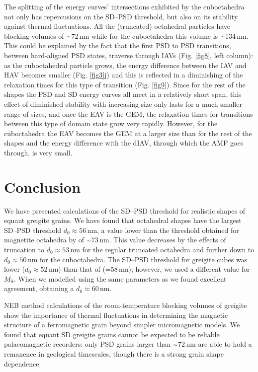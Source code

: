 \documentclass[review,authoryear]{elsarticle}
\newcommand{\roughly}{{\raise.17ex\hbox{$\scriptstyle\sim$}}}
\newcommand{\nm}{\,\text{nm}}
\begin{document}
The splitting of the energy curves' intersections exhibited by the cuboctahedra not only has repercusions on the SD--PSD threshold, but also on its stability against thermal fluctuations. All the (truncated) octahedral particles have blocking volumes of $\roughly$72$\nm$ while for the cuboctahedra this volume is $\roughly$134$\nm$. This could be explained by the fact that the first PSD to PSD transitions, between hard-aligned PSD states, traverse through IAVs (Fig. \ref{fig8}, left column): as the cuboctahedral particle grows, the energy difference between the IAV and HAV becomes smaller (Fig. \ref{fig3}j) and this is reflected in a diminishing of the relaxation times for this type of transition (Fig. \ref{fig9}). Since for the rest of the shapes the PSD and SD energy curves all meet in a relatively short span, this effect of diminished stability with increasing size only lasts for a much smaller range of sizes, and once the EAV is the GEM, the relaxation times for transitions between this type of domain state grow very rapidly. However, for the cuboctahedra the EAV becomes the GEM at a larger size than for the rest of the shapes and the energy difference with the dIAV, through which the AMP goes through, is very small.\par

\section{Conclusion}
We have presented calculations of the SD--PSD threshold for realistic shapes of equant greigite grains. We have found that octahedral shapes have the largest SD--PSD threshold $d_0\approx56\,\text{nm}$, a value lower than the threshold obtained for magnetite octahedra by \citet{Witt2005} of $\roughly$73$\nm$. This value decreases by the effects of truncation to $d_0\approx53\,\text{nm}$ for the regular truncated octahedra and further down to $d_0\approx50\,\text{nm}$ for the cuboctahedra. The SD--PSD threshold for greigite cubes was lower ($d_0\approx 52\,\text{nm}$) than that of \citet{Muxworthy2013} (=58$\nm$); however, we used a different value for $M_\text{S}$. When we modelled using the same parameters as \citet{Muxworthy2013} we found excellent agreement, obtaining a $d_0\approx 60\,\text{nm}$.\par
NEB method calculations of the room-temperature blocking volumes of greigite show the importance of thermal fluctuations in determining the magnetic structure of a ferromagnetic grain beyond simpler micromagnetic models. We found that equant SD greigite grains cannot be expected to be reliable palaeomagnetic recorders: only PSD grains larger than $\roughly$72$\nm$ are able to hold a remanence in geological timescales, though there is a strong grain shape dependence.\par
\end{document}
